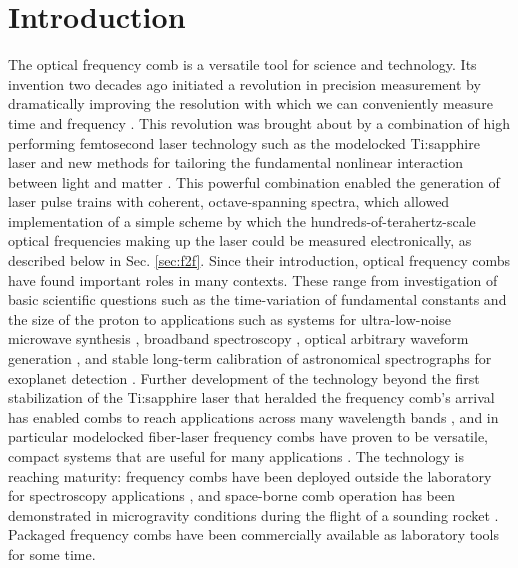  \chapter{Introduction}
\label{chap:introduction}

The optical frequency comb is a versatile tool for science and technology. Its invention two decades ago initiated a revolution in precision measurement by dramatically improving the resolution with which we can conveniently measure time and frequency \cite{Diddams2000,Jones2000,Diddams2001,Udem2002,Hall2006,Hansch2006}. This revolution was brought about by a combination of high performing femtosecond laser technology such as the modelocked Ti:sapphire laser \cite{Stingl1995} and new methods for tailoring the fundamental nonlinear interaction between light and matter \cite{Ranka2000,Dudley2006}. This powerful combination enabled the generation of laser pulse trains with coherent, octave-spanning spectra, which allowed implementation of a simple scheme by which the hundreds-of-terahertz-scale optical frequencies making up the laser could be measured electronically, as described below in Sec. \ref{sec:f2f}. Since their introduction, optical frequency combs have found important roles in many contexts. These range from investigation of basic scientific questions such as the time-variation of fundamental constants \cite{Lea2007,Blatt2008} and the size of the proton \cite{Beyer2017} to applications such as systems for ultra-low-noise microwave synthesis \cite{McFerran2005,Fortier2011}, broadband spectroscopy \cite{Diddams2007,Coddington2016}, optical arbitrary waveform generation \cite{Cundiff2010}, and stable long-term calibration of astronomical spectrographs for exoplanet detection \cite{Steinmetz2008}. Further development of the technology beyond the first stabilization of the Ti:sapphire laser that heralded the frequency comb's arrival has enabled combs to reach applications across many wavelength bands \cite{Washburn2004a,Gohle2005b,Diddams2010,Faist2016}, and in particular modelocked fiber-laser frequency combs have proven to be versatile, compact systems that are useful for many applications \cite{Newbury2007,Fermann2013,Sinclair2015}. The technology is reaching maturity: frequency combs have been deployed outside the laboratory for spectroscopy applications \cite{Sinclair2014,Coburn2018}, and space-borne comb operation has been demonstrated in microgravity conditions during the flight of a sounding rocket \cite{Lezius2016}. Packaged frequency combs have been commercially available as laboratory tools for some time.

